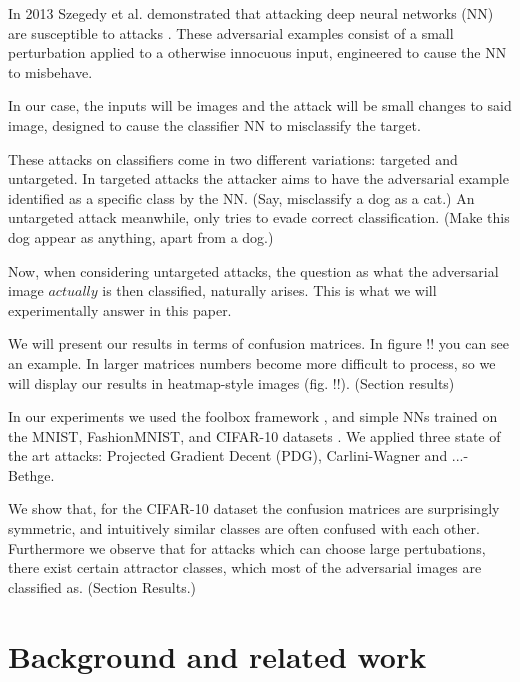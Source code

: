 \documentclass{article}
\begin{document}
In 2013 Szegedy et al. demonstrated that attacking deep neural networks (NN) are susceptible to attacks \cite{Szegedy13}. These adversarial examples consist of a small perturbation applied to a otherwise innocuous input, engineered to cause the NN to misbehave.

In our case, the inputs will be images and the attack will be small changes to said image, designed to cause the classifier NN to misclassify the target.

These attacks on classifiers come in two different variations: targeted and untargeted. 
In targeted attacks\cite{} the attacker aims to have the adversarial example identified as a specific class by the NN. (Say, misclassify a dog as a cat.)
An untargeted attack meanwhile, only tries to evade correct classification. (Make this dog appear as anything, apart from a dog.) 

Now, when considering untargeted attacks, the question as what the adversarial image $actually$ is then classified, naturally arises. This is what we will experimentally answer in this paper.

We will present our results in terms of confusion matrices. In figure !! you can see an example. In larger matrices numbers become more difficult to process, so we will display our results in heatmap-style images (fig. !!). (Section results)

In our experiments we used the foolbox framework \cite{}, and simple NNs trained on the MNIST, FashionMNIST, and CIFAR-10 datasets \cite{}. We applied three state of the art attacks: Projected Gradient Decent (PDG)\cite{}, Carlini-Wagner \cite{} and ...-Bethge\cite{}. 

We show that, for the CIFAR-10 dataset the confusion matrices are surprisingly symmetric, and intuitively similar classes are often confused with each other. Furthermore we observe that for attacks which can choose large pertubations, there exist certain attractor classes, which most of the adversarial images are classified as. (Section Results.)

%



\section{Background and related work}
\end{document}
